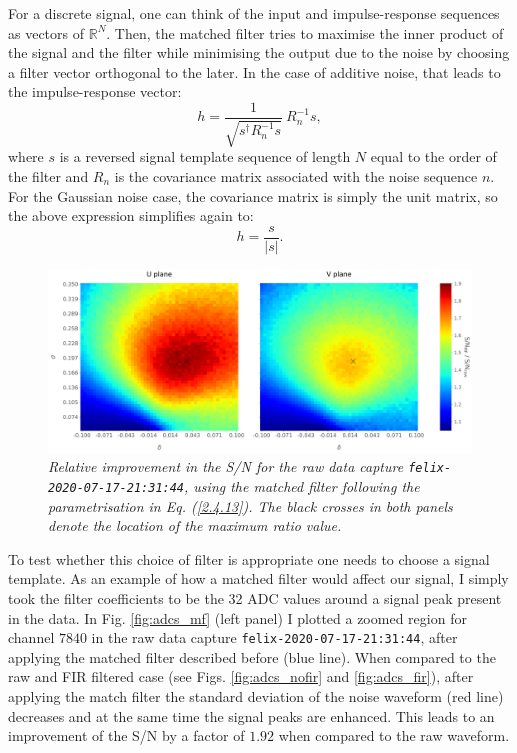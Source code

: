 For a discrete signal, one can think of the input and impulse-response sequences as vectors of $\mathbb{R}^{N}$. Then, the matched filter tries to maximise the inner product of the signal and the filter while minimising the output due to the noise by choosing a filter vector orthogonal to the later. In the case of additive noise, that leads to the impulse-response vector:
\begin{equation}\label{2.4.11}
	h = \frac{1}{\sqrt{s^{\dagger} R_{n}^{-1} s}} \ R_{n}^{-1} s,
\end{equation}
where $s$ is a reversed signal template sequence of length $N$ equal to the order of the filter and $R_{n}$ is the covariance matrix associated with the noise sequence $n$. For the Gaussian noise case, the covariance matrix is simply the unit matrix, so the above expression simplifies again to:
\begin{equation}\label{2.4.12}
	h = \frac{s}{|s|}.
\end{equation}

\begin{figure}[t]
	\centering
	\includegraphics[width=1\linewidth]{Images/Matched_Filter/mf_fir_opt.png}
	\caption{\textit{Relative improvement in the S/N for the raw data capture \texttt{felix-2020-07-17-21:31:44}, using the matched filter following the parametrisation in Eq. (\ref{2.4.13}). The black crosses in both panels denote the location of the maximum ratio value.}}
	\label{fig:mf_opt}
\end{figure}

To test whether this choice of filter is appropriate one needs to choose a signal template. As an example of how a matched filter would affect our signal, I simply took the filter coefficients to be the 32 ADC values around a signal peak present in the data. In Fig. \ref{fig:adcs_mf} (left panel) I plotted a zoomed region for channel $7840$ in the raw data capture \texttt{felix-2020-07-17-21:31:44}, after applying the matched filter described before (blue line). When compared to the raw and FIR filtered case (see Figs. \ref{fig:adcs_nofir} and \ref{fig:adcs_fir}), after applying the match filter the standard deviation of the noise waveform (red line) decreases and at the same time the signal peaks are enhanced. This leads to an improvement of the S/N by a factor of $1.92$ when compared to the raw waveform.

